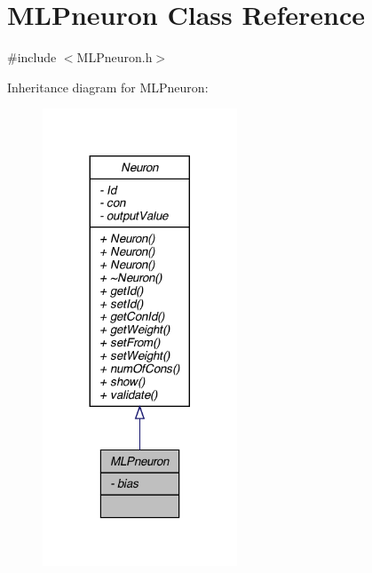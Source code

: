 \hypertarget{class_m_l_pneuron}{
\section{MLPneuron Class Reference}
\label{class_m_l_pneuron}
}


{\ttfamily \#include $<$MLPneuron.h$>$}



Inheritance diagram for MLPneuron:\nopagebreak
\begin{figure}[H]
\begin{center}
\leavevmode
\includegraphics[width=164pt]{class_m_l_pneuron__inherit__graph}
\end{center}
\end{figure}


